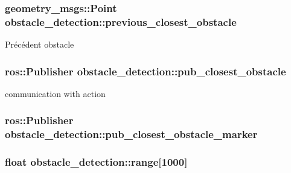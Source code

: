 \subsubsection[{\texorpdfstring{previous\+\_\+closest\+\_\+obstacle}{previous_closest_obstacle}}]{\setlength{\rightskip}{0pt plus 5cm}geometry\+\_\+msgs\+::\+Point obstacle\+\_\+detection\+::previous\+\_\+closest\+\_\+obstacle\hspace{0.3cm}{\ttfamily [private]}}\hypertarget{classobstacle__detection_a6619f1fc1e56dac5bf028c9dbab46773}{}\label{classobstacle__detection_a6619f1fc1e56dac5bf028c9dbab46773}
Précédent obstacle 
\subsubsection[{\texorpdfstring{pub\+\_\+closest\+\_\+obstacle}{pub_closest_obstacle}}]{\setlength{\rightskip}{0pt plus 5cm}ros\+::\+Publisher obstacle\+\_\+detection\+::pub\+\_\+closest\+\_\+obstacle\hspace{0.3cm}{\ttfamily [private]}}\hypertarget{classobstacle__detection_a8c385ba50b975608a9f7ca7dad292b14}{}\label{classobstacle__detection_a8c385ba50b975608a9f7ca7dad292b14}
communication with action 
\subsubsection[{\texorpdfstring{pub\+\_\+closest\+\_\+obstacle\+\_\+marker}{pub_closest_obstacle_marker}}]{\setlength{\rightskip}{0pt plus 5cm}ros\+::\+Publisher obstacle\+\_\+detection\+::pub\+\_\+closest\+\_\+obstacle\+\_\+marker\hspace{0.3cm}{\ttfamily [private]}}\hypertarget{classobstacle__detection_a9a68c83350a4cdac4cda4f035b9fd53a}{}\label{classobstacle__detection_a9a68c83350a4cdac4cda4f035b9fd53a}
\subsubsection[{\texorpdfstring{range}{range}}]{\setlength{\rightskip}{0pt plus 5cm}float obstacle\+\_\+detection\+::range\mbox{[}1000\mbox{]}\hspace{0.3cm}{\ttfamily [private]}}\hypertarget{classobstacle__detection_ac8fac86b4054441a9aecc7d9453f4cd6}{}\label{classobstacle__detection_ac8fac86b4054441a9aecc7d9453f4cd6}
